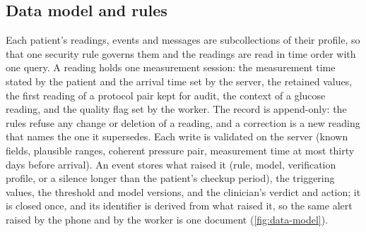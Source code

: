 \subsection{Data model and rules}\label{sec:record-schema}\label{sec:rules}

Each patient's readings, events and messages are subcollections of their profile, so that one security rule governs them and the readings are read in time order with one query. A reading holds one measurement session: the measurement time stated by the patient and the arrival time set by the server, the retained values, the first reading of a protocol pair kept for audit, the context of a glucose reading, and the quality flag set by the worker. The record is append-only: the rules refuse any change or deletion of a reading, and a correction is a new reading that names the one it supersedes. Each write is validated on the server (known fields, plausible ranges, coherent pressure pair, measurement time at most thirty days before arrival). An event stores what raised it (rule, model, verification profile, or a silence longer than the patient's checkup period), the triggering values, the threshold and model versions, and the clinician's verdict and action; it is closed once, and its identifier is derived from what raised it, so the same alert raised by the phone and by the worker is one document (\cref{fig:data-model}).

